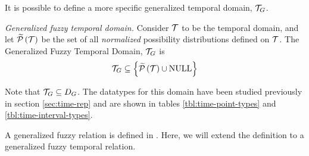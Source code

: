 


It is possible to define a more specific generalized temporal domain, $\mathcal{T}_G$.

\begin{definition}
\label{def:generalized-fuzzy-temporal-domain}
\emph{Generalized fuzzy temporal domain.}
Consider $\mathcal{T}$ to be the temporal domain, and let $\widetilde {\mathcal{P}}\left( \mathcal{T}\right)$ be the set of all \emph{normalized} possibility distributions defined on $\mathcal{T}$.
The Generalized Fuzzy Temporal Domain, $\mathcal{T}_G$ is
\begin{equation}
\mathcal{T}_G \subseteq \left \lbrace \widetilde {\mathcal{P}}\left( \mathcal{T}\right) \cup \text{NULL} \right \rbrace
\end{equation}
\end{definition}

Note that $\mathcal{T}_G \subseteq D_G$. The datatypes for this domain have been studied previously in section \ref{sec:time-rep} and are shown in tables \ref{tbl:time-point-types} and \ref{tbl:time-interval-types}.

A generalized fuzzy relation is defined in \cite{Medina1994}. Here, we will extend the definition to a generalized fuzzy temporal relation.

